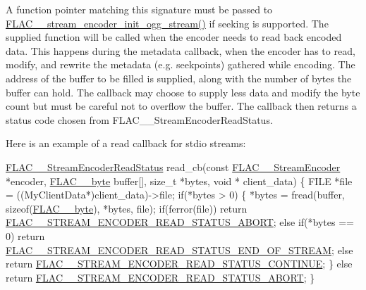 A function pointer matching this signature must be passed to \hyperlink{group__flac__stream__encoder_ga87af71d74c09f7d482f9f420ef9bf826}{F\+L\+A\+C\+\_\+\+\_\+stream\+\_\+encoder\+\_\+init\+\_\+ogg\+\_\+stream()} if seeking is supported. The supplied function will be called when the encoder needs to read back encoded data. This happens during the metadata callback, when the encoder has to read, modify, and rewrite the metadata (e.\+g. seekpoints) gathered while encoding. The address of the buffer to be filled is supplied, along with the number of bytes the buffer can hold. The callback may choose to supply less data and modify the byte count but must be careful not to overflow the buffer. The callback then returns a status code chosen from F\+L\+A\+C\+\_\+\+\_\+\+Stream\+Encoder\+Read\+Status.

Here is an example of a read callback for stdio streams\+: 
\begin{DoxyCode}
\hyperlink{group__flac__stream__encoder_ga2e81f007fb0a7414c0bbb453f37ea37f}{FLAC\_\_StreamEncoderReadStatus} read\_cb(\textcolor{keyword}{const} 
      \hyperlink{struct_f_l_a_c_____stream_encoder}{FLAC\_\_StreamEncoder} *encoder, \hyperlink{ordinals_8h_a5eb569b12d5b047cdacada4d57924ee3}{FLAC\_\_byte} buffer[], \textcolor{keywordtype}{size\_t} *bytes, \textcolor{keywordtype}{void} *
      client\_data)
\{
  FILE *file = ((MyClientData*)client\_data)->file;
  \textcolor{keywordflow}{if}(*bytes > 0) \{
    *bytes = fread(buffer, \textcolor{keyword}{sizeof}(\hyperlink{ordinals_8h_a5eb569b12d5b047cdacada4d57924ee3}{FLAC\_\_byte}), *bytes, file);
    \textcolor{keywordflow}{if}(ferror(file))
      \textcolor{keywordflow}{return} \hyperlink{group__flac__stream__encoder_gga2e81f007fb0a7414c0bbb453f37ea37fa69b94eeab60e07d5fd33f2b3c8b85759}{FLAC\_\_STREAM\_ENCODER\_READ\_STATUS\_ABORT};
    \textcolor{keywordflow}{else} \textcolor{keywordflow}{if}(*bytes == 0)
      \textcolor{keywordflow}{return} \hyperlink{group__flac__stream__encoder_gga2e81f007fb0a7414c0bbb453f37ea37fa562fef84bf86a9a39682e23066d9cfee}{FLAC\_\_STREAM\_ENCODER\_READ\_STATUS\_END\_OF\_STREAM};
    \textcolor{keywordflow}{else}
      \textcolor{keywordflow}{return} \hyperlink{group__flac__stream__encoder_gga2e81f007fb0a7414c0bbb453f37ea37fa4bdd691d3666f19ec96ff99402347a2e}{FLAC\_\_STREAM\_ENCODER\_READ\_STATUS\_CONTINUE};
  \}
  \textcolor{keywordflow}{else}
    \textcolor{keywordflow}{return} \hyperlink{group__flac__stream__encoder_gga2e81f007fb0a7414c0bbb453f37ea37fa69b94eeab60e07d5fd33f2b3c8b85759}{FLAC\_\_STREAM\_ENCODER\_READ\_STATUS\_ABORT};
\}
\end{DoxyCode}


